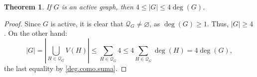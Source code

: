 \documentclass[11pt]{article}
\DeclareMathOperator{\act}{act}
\newtheorem{theorem}{Theorem}[section]
\newtheorem{corollary}[corollary]{Corollary}
\begin{document}
%
%

\begin{theorem}
	\label{|G^*|}
	If $G$ is an active graph, then $4 \leq |G| \leq 4\deg(G)$.
\end{theorem}

\begin{proof}
	Since $G$ is active, it is clear that $\mathcal{Q}_G \neq \varnothing$, as $\deg(G) \geq 1$. Thus, $|G| \geq 4$. On the other hand:
	\begin{equation*}
		|G| = \left|\bigcup_{H \in \mathcal{Q}_G} V(H)\right| \leq \sum_{H \in \mathcal{Q}_G} 4 \leq 4 \sum_{H \in \mathcal{Q}_G} \deg(H) = 4\deg(G),
	\end{equation*}
	the last equality by \eqref{deg.como.suma}.
\end{proof}
\end{document}
